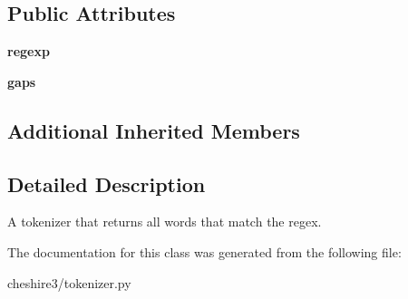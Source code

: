 \subsection*{Public Attributes}
\begin{DoxyCompactItemize}
\item 
\hypertarget{classcheshire3_1_1tokenizer_1_1_regexp_find_tokenizer_ad1b2418a2c4edc76414a5458b62ca7bb}{{\bfseries regexp}}\label{classcheshire3_1_1tokenizer_1_1_regexp_find_tokenizer_ad1b2418a2c4edc76414a5458b62ca7bb}

\item 
\hypertarget{classcheshire3_1_1tokenizer_1_1_regexp_find_tokenizer_a2d0c015caac7582d4b7aa690d2d6564b}{{\bfseries gaps}}\label{classcheshire3_1_1tokenizer_1_1_regexp_find_tokenizer_a2d0c015caac7582d4b7aa690d2d6564b}

\end{DoxyCompactItemize}
\subsection*{Additional Inherited Members}


\subsection{Detailed Description}
\begin{DoxyVerb}A tokenizer that returns all words that match the regex.\end{DoxyVerb}
 

The documentation for this class was generated from the following file\-:\begin{DoxyCompactItemize}
\item 
cheshire3/tokenizer.\-py\end{DoxyCompactItemize}
